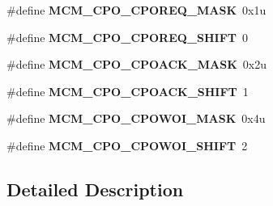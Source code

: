 \begin{DoxyCompactItemize}
\item 
\hypertarget{group___m_c_m___register___masks_ga36f43d6467fbe16e5585829747471da9}{}\#define {\bfseries M\+C\+M\+\_\+\+C\+P\+O\+\_\+\+C\+P\+O\+R\+E\+Q\+\_\+\+M\+A\+S\+K}~0x1u\label{group___m_c_m___register___masks_ga36f43d6467fbe16e5585829747471da9}

\item 
\hypertarget{group___m_c_m___register___masks_ga4787ad168d88290f8da659a6b30e243d}{}\#define {\bfseries M\+C\+M\+\_\+\+C\+P\+O\+\_\+\+C\+P\+O\+R\+E\+Q\+\_\+\+S\+H\+I\+F\+T}~0\label{group___m_c_m___register___masks_ga4787ad168d88290f8da659a6b30e243d}

\item 
\hypertarget{group___m_c_m___register___masks_ga039f47e9952c17908e79eace8fd0139c}{}\#define {\bfseries M\+C\+M\+\_\+\+C\+P\+O\+\_\+\+C\+P\+O\+A\+C\+K\+\_\+\+M\+A\+S\+K}~0x2u\label{group___m_c_m___register___masks_ga039f47e9952c17908e79eace8fd0139c}

\item 
\hypertarget{group___m_c_m___register___masks_gaa9a8977b3a452ae07fb7ca851c5ee47e}{}\#define {\bfseries M\+C\+M\+\_\+\+C\+P\+O\+\_\+\+C\+P\+O\+A\+C\+K\+\_\+\+S\+H\+I\+F\+T}~1\label{group___m_c_m___register___masks_gaa9a8977b3a452ae07fb7ca851c5ee47e}

\item 
\hypertarget{group___m_c_m___register___masks_ga154f71ae507ca3bac1e2c2a9dbd1dcd5}{}\#define {\bfseries M\+C\+M\+\_\+\+C\+P\+O\+\_\+\+C\+P\+O\+W\+O\+I\+\_\+\+M\+A\+S\+K}~0x4u\label{group___m_c_m___register___masks_ga154f71ae507ca3bac1e2c2a9dbd1dcd5}

\item 
\hypertarget{group___m_c_m___register___masks_ga369c1ed9bf00d8317ea868b2ea1b0572}{}\#define {\bfseries M\+C\+M\+\_\+\+C\+P\+O\+\_\+\+C\+P\+O\+W\+O\+I\+\_\+\+S\+H\+I\+F\+T}~2\label{group___m_c_m___register___masks_ga369c1ed9bf00d8317ea868b2ea1b0572}

\end{DoxyCompactItemize}


\subsection{Detailed Description}
